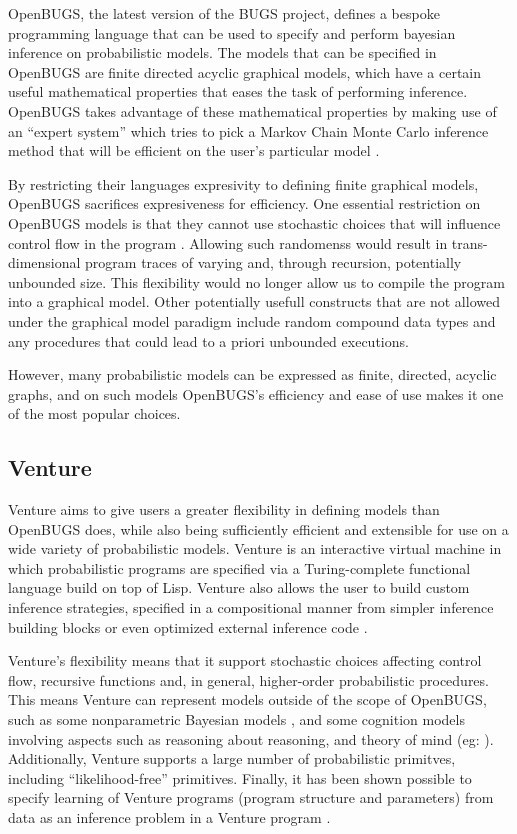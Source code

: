 OpenBUGS, the latest version of the BUGS project, defines a bespoke programming language that can be used to specify and perform bayesian inference on probabilistic models. The models that can be specified in OpenBUGS are finite directed acyclic graphical models, which have a certain useful mathematical properties that eases the task of performing inference. OpenBUGS takes advantage of these mathematical properties by making use of an ``expert system'' which tries to pick a Markov Chain Monte Carlo inference method that will be efficient on the user's particular model \cite{bugsOverview}.

By restricting their languages expresivity to defining finite graphical models, OpenBUGS sacrifices expresiveness for efficiency. One essential restriction on OpenBUGS models is that they cannot use stochastic choices that will influence control flow in the program \cite{lunn2009bugs}. Allowing such randomenss would result in trans-dimensional program traces of varying and, through recursion, potentially unbounded size. This flexibility would no longer allow us to compile the program into a graphical model. Other potentially usefull constructs that are not allowed under the graphical model paradigm include random compound data types and any procedures that could lead to a priori unbounded executions.

However, many probabilistic models can be expressed as finite, directed, acyclic graphs, and on such models OpenBUGS's efficiency and ease of use makes it one of the most popular choices.

\subsection{Venture}

Venture aims to give users a greater flexibility in defining models than OpenBUGS does, while also being sufficiently efficient and extensible for use on a wide variety of probabilistic models. Venture is an interactive virtual machine in which probabilistic programs are specified via a Turing-complete functional language build on top of Lisp. Venture also allows the user to build custom inference strategies, specified in a compositional manner from simpler inference building blocks or even optimized external inference code \cite{mansinghka2014venture}. 

Venture's flexibility means that it support stochastic choices affecting control flow, recursive functions and, in general, higher-order probabilistic procedures. This means Venture can represent models outside of the scope of OpenBUGS, such as some nonparametric Bayesian models \cite{roy2008stochastic}, and some cognition models involving aspects such as reasoning about reasoning, and theory of mind (eg: \cite{probMods, gerstenberg2012ping}). Additionally, Venture supports a large number of probabilistic primitves, including ``likelihood-free'' primitives. Finally, it has been shown possible to specify learning of Venture programs (program structure and parameters) from data as an inference problem in a Venture program \cite{mansinghka2009natively}.

